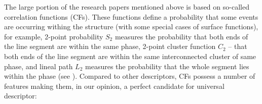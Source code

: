 \documentclass[reprint,amsmath,amssymb,aps,pre,showkeys,showpacs]{revtex4-1}
\newcommand{\highlight}[1]{{\color{red}{#1}}} %
\begin{document}
The large portion of the research papers mentioned above
\cite{rozenbaum2014,karsanina2015,ledesma2018,derossi2019,portillo2018developing,
  takada2003three,hopkins2013stars,jiao2013,Torquato_book,roding2020predicting,
  KarsaninaEJSS,capek2009,gerke2019tensor,REVpaper,LavrukhinPRE,Adler_recon,Y-T,
  tahmasebiPRL,Euras2012,EPL2,karsaninaPRL,jiao2007,SciRep1,Havelka,Geoderma2018}
is based on so-called correlation functions (CFs). These functions define a
probability that some events are occurring withing the structure (with some
special cases of surface functions), for example, 2-point probability $S_2$
measures the probability that both ends of the line segment are within the same
phase, 2-point cluster function $C_2$ -- that both ends of the line segment are
within the same interconnected cluster of same phase, and lineal path $L_2$
measures the probability that the whole segment lies within the phase (see
\highlight{Fig.1}). Compared to other descriptors, CFs possess a number of
features making them, in our opinion, a perfect candidate for universal
descriptor:
\end{document}
